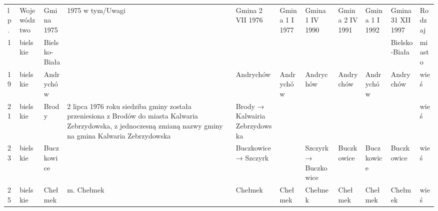 \begin{table}[]
\begin{tabular}{lllllllllll}
lp. & Województwo & Gmina 1975    & 1975 w tym/Uwagi                                                                                                                                                                                               & Gmina 2 VII 1976               & Gmina 1 I 1977        & Gmina 1 IV 1990       & Gmina 2 IV 1991       & Gmina 1 I 1992        & Gmina 31 XII 1997     & Rodzaj \\
1   & bielskie    & Bielsko-Biała &                                                                                                                                                                                                                &                                &                       &                       &                       &                       & Bielsko-Biała         & miasto \\
19  & bielskie    & Andrychów     &                                                                                                                                                                                                                & Andrychów                      & Andrychów             & Andrychów             & Andrychów             & Andrychów             & Andrychów             & wieś   \\
21  & bielskie    & Brody         & 2 lipca 1976 roku siedziba gminy została przeniesiona z Brodów do miasta Kalwaria Zebrzydowska, z jednoczesną zmianą nazwy gminy na gmina Kalwaria Zebrzydowska                                                & Brody → Kalwairia Zebrzydowska &                       &                       &                       &                       &                       & wieś   \\
23  & bielskie    & Buczkowice    &                                                                                                                                                                                                                & Buczkowice → Szczyrk           &                       & Szczyrk → Buczkowice  & Buczkowice            & Buczkowice            & Buczkowice            & wieś   \\
25  & bielskie    & Chełmek       & m. Chełmek                                                                                                                                                                                                     & Chełmek                        & Chełmek               & Chełmek               & Chełmek               & Chełmek               & Chełmek               & wieś   \\

\end{tabular}
\end{table}
